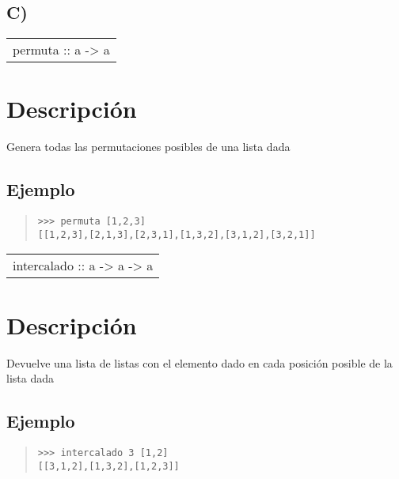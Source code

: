 \subsection{C)}
\begin{haddockdesc}
\item[\begin{tabular}{@{}l}
permuta :: {\char 91}a{\char 93} -> {\char 91}{\char 91}a{\char 93}{\char 93}
\end{tabular}]
{\haddockbegindoc
\section*{Descripción}
Genera todas las permutaciones posibles de una lista dada\par
\subsection*{Ejemplo}
\begin{quote}
{\haddockverb\begin{verbatim}
>>> permuta [1,2,3]
[[1,2,3],[2,1,3],[2,3,1],[1,3,2],[3,1,2],[3,2,1]]

\end{verbatim}}
\end{quote}}
\end{haddockdesc}
\begin{haddockdesc}
\item[\begin{tabular}{@{}l}
intercalado :: a -> {\char 91}a{\char 93} -> {\char 91}{\char 91}a{\char 93}{\char 93}
\end{tabular}]
{\haddockbegindoc
\section*{Descripción}
Devuelve una lista de listas con el elemento dado en cada posición posible de la lista dada\par
\subsection*{Ejemplo}
\begin{quote}
{\haddockverb\begin{verbatim}
>>> intercalado 3 [1,2]
[[3,1,2],[1,3,2],[1,2,3]]

\end{verbatim}}
\end{quote}}
\end{haddockdesc}

